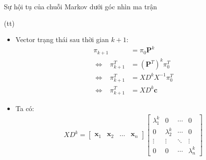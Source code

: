\begin{frame}{Sự hội tụ của chuỗi Markov dưới góc nhìn ma trận}
    \begin{myproof*}{(tt)}
    \begin{itemize}
        \item[\bullet] Vector trạng thái sau thời gian $k+1$:
        \begin{align}
            \pi_{k+1} &= \pi_0 \mathbf{P}^k \\
            \Leftrightarrow \hspace{10pt} \pi_{k+1}^T &= (\mathbf{P}^T)^k \pi_0^{T} \\
            \Leftrightarrow \hspace{10pt} \pi_{k+1}^T &= X D^k X^{-1} \pi_0^{T} \\
            \Leftrightarrow \hspace{10pt} \pi_{k+1}^T &= X D^k \textbf{c}
        \end{align}
    \item[\bullet] Ta có:
        \begin{align}
            X D^k =  \begin{bmatrix}
            \textbf{x}_1& \textbf{x}_2 & \dots& \textbf{x}_n
            \end{bmatrix} 
            \begin{bmatrix}
            \lambda_1^k&0& \dotsb &0\\
            0&\lambda_2^k& \dotsb &0\\
            \vdots & \vdots & \ddots & \vdots\\
            0&0&\dotsb & \lambda_n^k
            \end{bmatrix}
        \end{align}
    \end{itemize}
    \end{myproof*}
\end{frame}
